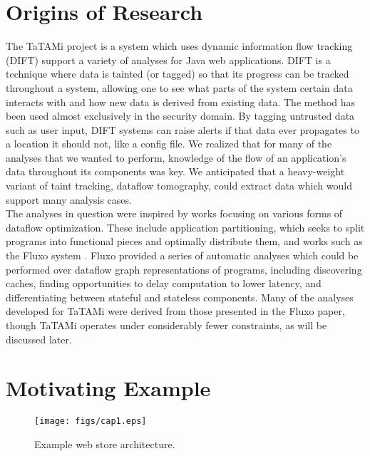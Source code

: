 \documentclass[msc,oneside]{ubcthesis}
\begin{document}
	
\section{Origins of Research}
		
The TaTAMi project is a system which uses dynamic information flow tracking (DIFT) support a variety of analyses for Java web applications.  DIFT is a technique where data is tainted (or tagged) so that its progress can be tracked throughout a system, allowing one to see what parts of the system certain data interacts with and how new data is derived from existing data. The method has been used almost exclusively in the security domain. By tagging untrusted data such as user input, DIFT systems can raise alerts if that data ever propagates to a location it should not, like a config file. We realized that for many of the analyses that we wanted to perform, knowledge of the flow of an application's data throughout its components was key. We anticipated that a heavy-weight variant of taint tracking, dataflow tomography, could extract data which would support many analysis cases.\\

The analyses in question were inspired by works focusing on various forms of dataflow optimization. These include application partitioning, which seeks to split programs into functional pieces and optimally distribute them, and works such as the Fluxo system \cite{Kiciman2010}. Fluxo provided a series of automatic analyses which could be performed over dataflow graph representations of programs, including discovering caches, finding opportunities to delay computation to lower latency, and differentiating between stateful and stateless components. Many of the analyses developed for TaTAMi were derived from those presented in the Fluxo paper, though TaTAMi operates under considerably fewer constraints, as will be discussed later.	
	
\section{Motivating Example}

\begin{figure}[ht]
  \begin{center}
    \texttt{[image: figs/cap1.eps]}
    \caption[Example web store architecture.]{\label{fig:cap1} Example web store architecture.}
  \end{center}
\end{figure}
\end{document}
